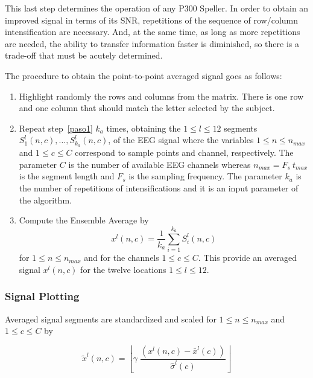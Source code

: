 \documentclass[utf8]{frontiersSCNS} %
\begin{document}
\begin{itemize}
This last step determines the operation of any P300 Speller.  In order to obtain an improved signal in terms of its SNR,  repetitions of the sequence of row/column intensification are necessary.  And, at the same time, as long as more repetitions are needed, the ability to transfer information faster is diminished, so there is a trade-off that must be acutely determined.

The procedure to obtain the point-to-point averaged signal goes as follows:

\begin{enumerate}
\item \label{paso1}Highlight randomly the rows and columns from the matrix.  There is one row and one column that should match the letter selected by the subject.
\item  \label{paso2} Repeat step~\ref{paso1} $k_a$ times, obtaining the $1 \leq l \leq 12$ segments $S_1^l(n,c),\dots,S_{k_a}^l(n,c)$, of the EEG signal where the variables $1 \leq n \leq n_{max}$ and $1 \leq c \leq C$  correspond to sample points and channel, respectively. The parameter $C$ is the number of available EEG channels whereas $n_{max}=F_s \  t_{max}$ is the segment length and $F_s$ is the sampling frequency.  The parameter $k_a$ is the number of repetitions of intensifications and it is an input parameter of the algorithm.
\item \label{paso3} Compute the Ensemble Average by
\begin{equation}
x^l(n,c)= \frac{1}{k_a}\sum_{i=1}^{k_a}S_i^l(n,c) 
\label{averaging}
\end{equation}  
for $1 \leq n \leq n_{max}$ and for the channels $1 \leq c \leq C$.  This provide an averaged signal $x^l(n,c)$ for the twelve locations $ 1 \leq l \leq 12$.
\end{enumerate}
\end{itemize}

\subsubsection{Signal Plotting} \label{Plot}

Averaged signal segments are standardized and scaled for $1 \leq n \leq n_{max}$ and $1 \leq c \leq C$ by 

\begin{equation}
\tilde{x}^l(n,c) = \left \lfloor{ \gamma \; \frac{( x^l(n,c) - \bar{x}^l(c)  )}{ \hat{\sigma}^l(c) } }\right \rfloor
\label{eq:standarizedaverages}
\end{equation}
\end{document}

